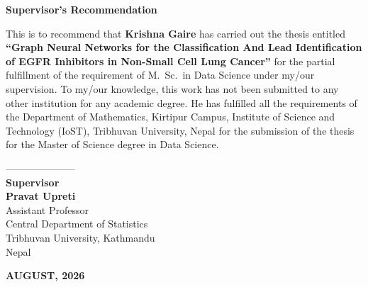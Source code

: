 
\cleardoublepage
{}
{}
\thispagestyle{plain}

\begin{center}
{\fontsize{16}{20}\selectfont\textbf{Supervisor's Recommendation}}
\end{center}

\vspace{0.5cm}

\begin{onehalfspace}
\noindent
This is to recommend that \textbf{Krishna Gaire} has carried out
the thesis entitled \textbf{``Graph Neural Networks for the
Classification And Lead Identification of EGFR Inhibitors in
Non-Small Cell Lung Cancer''} for the partial fulfillment of the
requirement of M.\ Sc.\ in Data Science under my/our supervision.
To my/our knowledge, this work has not been submitted to any other
institution for any academic degree. He has fulfilled all the
requirements of the Department of Mathematics, Kirtipur Campus,
Institute of Science and Technology (IoST), Tribhuvan University,
Nepal for the submission of the thesis for the Master of Science
degree in Data Science.
\end{onehalfspace}

\vspace{2.5cm}

\begin{onehalfspace}
\noindent
---------------------\\[0.2cm]
\textbf{Supervisor}\\[0.2cm]
\textbf{Pravat Upreti}\\
Assistant Professor\\
Central Department of Statistics\\
Tribhuvan University, Kathmandu\\
Nepal

\vfill

\begin{center}
\textbf{AUGUST, 2026}
\end{center}
\vspace{0.5cm}
\end{onehalfspace}